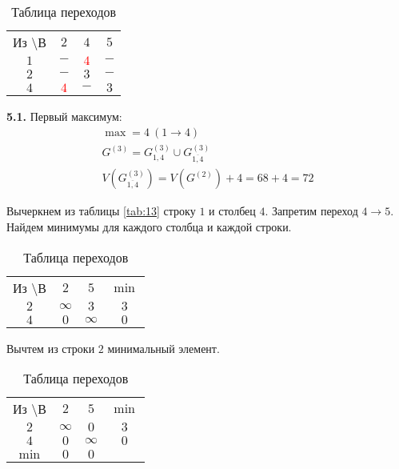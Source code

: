 \begin{table}[H]
\begin{center}
	\def\tabcolsep{15pt}
	\caption{Таблица переходов}
	\label{tab:14}
	\begin{tabular}{|c||c|c|c|}
		\hline
		Из \textbackslash В & $2$ & $4$ & $5$ \\
		\hhline{|=#=|=|=|}
		$1$ & $-$ & \textcolor{red}{\boldmath$4$} & $-$ \\
		\hline
		$2$ & $-$ & $3$ & $-$ \\
		\hline
		$4$ & \textcolor{red}{\boldmath$4$} & $-$ & $3$ \\
		\hline
	\end{tabular}
\end{center}
\end{table}

\textbf{5.1.} Первый максимум:
\begin{gather*}
\max = 4\ (1 \rightarrow 4) \\
G^{(3)} = G_{1,4}^{(3)} \cup G_{\overline{1,4}}^{(3)} \\
V(G_{\overline{1,4}}^{(3)}) = V(G^{(2)}) + 4 = 68 + 4 = 72
\end{gather*}

Вычеркнем из таблицы \ref{tab:13} строку $1$ и столбец $4$. Запретим переход $4 \rightarrow 5$. Найдем минимумы для каждого столбца и каждой строки.

\begin{table}[H]
\begin{center}
	\def\tabcolsep{15pt}
	\caption{Таблица переходов}
	\label{tab:15}
	\begin{tabular}{|c||c|c|c|}
		\hline
		Из \textbackslash В & $2$ & $5$ & $\min$ \\
		\hhline{|=#=|=|=|}
		$2$ & $\infty$ & $3$ & $3$ \\
		\hline
		$4$ & $0$ & $\infty$ & $0$ \\
		\hline
	\end{tabular}
\end{center}
\end{table}

Вычтем из строки $2$ минимальный элемент.

\begin{table}[H]
\begin{center}
	\def\tabcolsep{15pt}
	\caption{Таблица переходов}
	\label{tab:16}
	\begin{tabular}{|c||c|c|c|}
		\hline
		Из \textbackslash В & $2$ & $5$ & $\min$ \\
		\hhline{|=#=|=|=|}
		$2$ & $\infty$ & $0$ & $3$ \\
		\hline
		$4$ & $0$ & $\infty$ & $0$ \\
		\hhline{|=#=|=|=|}
		$\min$ & $0$ & $0$ & \\ 
		\hline
	\end{tabular}
\end{center}
\end{table}

